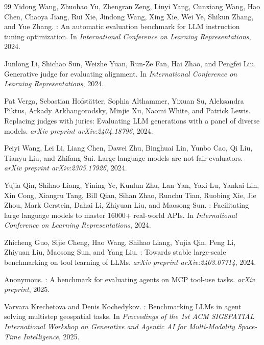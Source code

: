 \begin{thebibliography}{99}
Yidong Wang, Zhuohao Yu, Zhengran Zeng, Linyi Yang, Cunxiang Wang, Hao Chen, Chaoya Jiang, Rui Xie, Jindong Wang, Xing Xie, Wei Ye, Shikun Zhang, and Yue Zhang.
: An automatic evaluation benchmark for {LLM} instruction tuning optimization.
\newblock In \emph{International Conference on Learning Representations}, 2024.

Junlong Li, Shichao Sun, Weizhe Yuan, Run-Ze Fan, Hai Zhao, and Pengfei Liu.
\newblock Generative judge for evaluating alignment.
\newblock In \emph{International Conference on Learning Representations}, 2024.

Pat Verga, Sebastian Hofst{\"a}tter, Sophia Althammer, Yixuan Su, Aleksandra Piktus, Arkady Arkhangorodsky, Minjie Xu, Naomi White, and Patrick Lewis.
\newblock Replacing judges with juries: Evaluating {LLM} generations with a panel of diverse models.
\newblock \emph{arXiv preprint arXiv:2404.18796}, 2024.

Peiyi Wang, Lei Li, Liang Chen, Dawei Zhu, Binghuai Lin, Yunbo Cao, Qi Liu, Tianyu Liu, and Zhifang Sui.
\newblock Large language models are not fair evaluators.
\newblock \emph{arXiv preprint arXiv:2305.17926}, 2024.

Yujia Qin, Shihao Liang, Yining Ye, Kunlun Zhu, Lan Yan, Yaxi Lu, Yankai Lin, Xin Cong, Xiangru Tang, Bill Qian, Sihan Zhao, Runchu Tian, Ruobing Xie, Jie Zhou, Mark Gerstein, Dahai Li, Zhiyuan Liu, and Maosong Sun.
: Facilitating large language models to master 16000+ real-world {APIs}.
\newblock In \emph{International Conference on Learning Representations}, 2024.

Zhicheng Guo, Sijie Cheng, Hao Wang, Shihao Liang, Yujia Qin, Peng Li, Zhiyuan Liu, Maosong Sun, and Yang Liu.
: Towards stable large-scale benchmarking on tool learning of {LLMs}.
\newblock \emph{arXiv preprint arXiv:2403.07714}, 2024.

Anonymous.
: A benchmark for evaluating agents on {MCP} tool-use tasks.
\newblock \emph{arXiv preprint}, 2025.

Varvara Krechetova and Denis Kochedykov.
: Benchmarking {LLMs} in agent solving multistep geospatial tasks.
\newblock In \emph{Proceedings of the 1st ACM SIGSPATIAL International Workshop on Generative and Agentic AI for Multi-Modality Space-Time Intelligence}, 2025.


\end{thebibliography}
